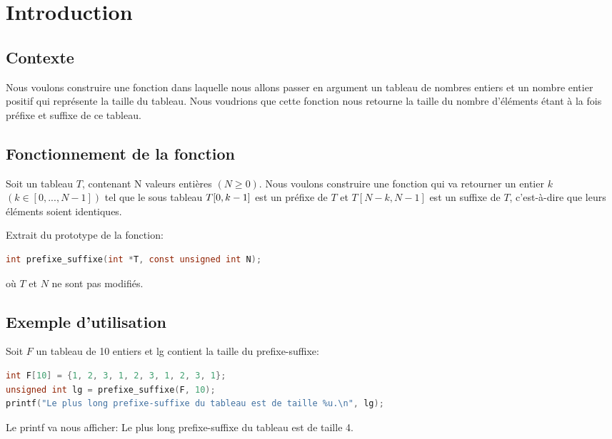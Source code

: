 \section{Introduction}\label{introduction}
\subsection{Contexte}
Nous voulons construire une fonction dans laquelle nous allons passer en argument
un tableau de nombres entiers et un nombre entier positif qui représente la taille du tableau.
Nous voudrions que cette fonction nous retourne la taille du nombre d'éléments
étant à la fois préfixe et suffixe de ce tableau.

\subsection{Fonctionnement de la fonction}
Soit un tableau $T$, contenant N valeurs entières $(N \geq 0)$. Nous 
voulons construire une fonction qui va retourner un entier $k$ $(k \in [0, ...,
 N-1])$ tel que le sous tableau $T[0,\space k-1]$ est un préfixe de $T$ et 
$T[N-k, N-1]$ est un suffixe de $T$, c'est-à-dire que leurs éléments soient
identiques.

Extrait du prototype de la fonction:
\begin{lstlisting}[language=C, caption=Fonction souhaitée]
int prefixe_suffixe(int *T, const unsigned int N);
\end{lstlisting}
où $T$ et $N$ ne sont pas modifiés.

\subsection{Exemple d'utilisation}
Soit $F$ un tableau de 10 entiers et lg contient la taille du prefixe-suffixe:
\begin{lstlisting}[language=C, caption=Exemple d'utilisation]
int F[10] = {1, 2, 3, 1, 2, 3, 1, 2, 3, 1};
unsigned int lg = prefixe_suffixe(F, 10);
printf("Le plus long prefixe-suffixe du tableau est de taille %u.\n", lg);
\end{lstlisting}

Le printf va nous afficher: Le plus long prefixe-suffixe du tableau est de
taille 4.
